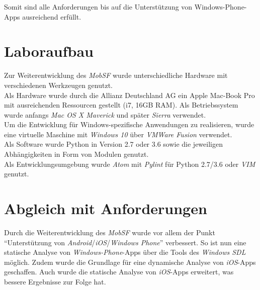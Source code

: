 Somit sind alle Anforderungen bis auf die Unterstützung von Windows-Phone-Apps ausreichend erfüllt.

\pagebreak	
\section{Laboraufbau}
Zur Weiterentwicklung des \textit{MobSF} wurde unterschiedliche Hardware mit verschiedenen Werkzeugen genutzt.\\

Als Hardware wurde durch die Allianz Deutschland AG ein Apple Mac-Book Pro mit ausreichenden Ressourcen gestellt (i7, 16GB RAM). Als Betriebssystem wurde anfangs \textit{Mac OS X Maverick} und später \textit{Sierra} verwendet.\\

Um die Entwicklung für Windows-spezifische Anwendungen zu realisieren, wurde eine virtuelle Maschine mit \textit{Windows  10} über \textit{VMWare Fusion} verwendet.\\

Als Software wurde Python in Version 2.7 oder 3.6 sowie die jeweiligen Abhängigkeiten in Form von Modulen genutzt.\\

Als Entwicklungsumgebung wurde \textit{Atom} mit \textit{Pylint} für Python 2.7/3.6 oder \textit{VIM} genutzt.

	


		

  
\section{Abgleich mit Anforderungen}
Durch die Weiterentwicklung des \textit{MobSF} wurde vor allem der Punkt "`Unterstützung von \textit{Android}/\textit{iOS}/\textit{Windows Phone}"' verbessert. So ist nun eine statische Analyse von \textit{Windows-Phone}-Apps über die Tools des \textit{Windows SDL} möglich. Zudem wurde die Grundlage für eine dynamische Analyse von \textit{iOS}-Apps geschaffen. Auch wurde die statische Analyse von \textit{iOS}-Apps erweitert, was bessere Ergebnisse zur Folge hat.\\


